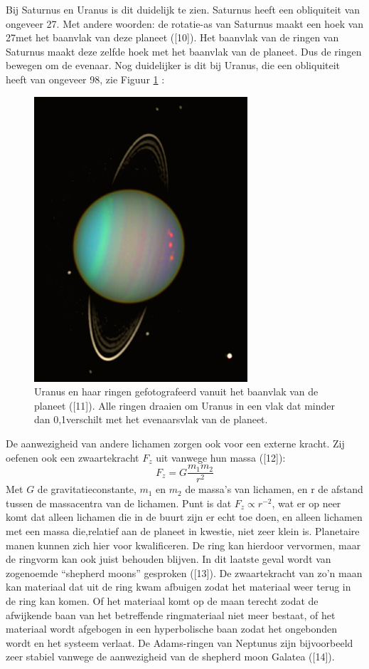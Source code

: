 \documentclass[a4paper]{article}
\begin{document}
\noindent
Bij Saturnus en Uranus is dit duidelijk te zien. Saturnus heeft een obliquiteit van ongeveer 27\degree. Met andere woorden: de rotatie-as van Saturnus maakt een hoek van 27\degree met het baanvlak van deze planeet ([10]). Het baanvlak van de ringen van Saturnus maakt deze zelfde hoek met het baanvlak van de planeet. Dus de ringen bewegen om de evenaar. Nog duidelijker is dit bij Uranus, die een obliquiteit heeft van ongeveer 98\degree, zie Figuur \ref{fig:uranus} :
	\begin{figure}[h]
		\centering
		\includegraphics[scale=0.43]{img/uranus.jpg}
		\caption{Uranus en haar ringen gefotografeerd vanuit het baanvlak van de planeet ([11]). Alle ringen draaien om Uranus in een vlak dat minder dan 0,1\degree verschilt met het evenaarsvlak van de planeet.}
		\label{fig:uranus}
	\end{figure}
	De aanwezigheid van andere lichamen zorgen ook voor een externe kracht. Zij oefenen ook een zwaartekracht $F_z$ uit vanwege hun massa ([12]):
	\begin{equation}
	F_z=G\frac{m_1 m_2}{r^2}
	\end{equation}
	Met $G$ de gravitatieconstante, $m_1$ en $m_2$ de massa’s van lichamen, en r de afstand tussen de massacentra van de lichamen. Punt is dat $F_z \propto r^{-2}$, wat er op neer komt dat alleen lichamen die in de buurt zijn er echt toe doen, en alleen lichamen met een massa die,relatief aan de planeet in kwestie, niet zeer klein is. Planetaire manen kunnen zich hier voor kwalificeren. De ring kan hierdoor vervormen, maar de ringvorm kan ook juist behouden blijven. In dit laatste geval wordt van zogenoemde ``shepherd moons'' gesproken ([13]). De zwaartekracht van zo'n maan kan materiaal dat uit de ring kwam afbuigen zodat het materiaal weer terug in de ring kan komen. Of het materiaal komt op de maan terecht zodat de afwijkende baan van het betreffende ringmateriaal niet meer bestaat, of het materiaal wordt afgebogen in een hyperbolische baan zodat het ongebonden wordt en het systeem verlaat. De Adams-ringen van Neptunus zijn bijvoorbeeld zeer stabiel vanwege de aanwezigheid van de shepherd moon Galatea ([14]).\\
	
\end{document}

